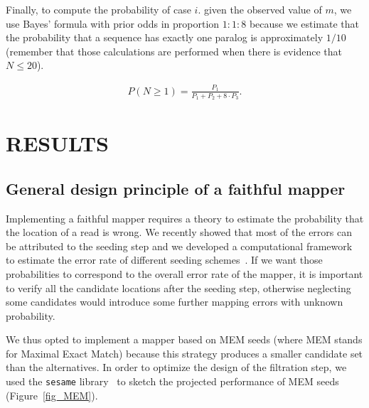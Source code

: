 \documentclass[english]{article}
\begin{document}
Finally, to compute the probability of case $i.$ given the observed value
of $m$, we use Bayes' formula with prior odds in proportion $1:1:8$ because
we estimate that the probability that a sequence has exactly one paralog
is approximately $1/10$ (remember that those calculations are performed
when there is evidence that $N \leq 20$).

\begin{align*}
P(N \geq 1) = \frac{P_1}{P_1 + P_2 + 8\cdot P_3}.
\end{align*}


\section{RESULTS}

\subsection{General design principle of a faithful mapper}

Implementing a faithful mapper requires a theory to estimate the
probability that the location of a read is wrong. We recently showed that
most of the errors can be attributed to the seeding step and we developed
a computational framework to estimate the error rate of different seeding
schemes~\cite{Filion619155}. If we want those probabilities to correspond
to the overall error rate of the mapper, it is important to verify all the
candidate locations after the seeding step, otherwise neglecting some
candidates would introduce some further mapping errors with unknown
probability.

We thus opted to implement a mapper based on MEM seeds (where MEM stands
for Maximal Exact Match) because this strategy produces a smaller
candidate set than the alternatives. In order to optimize the design of
the filtration step, we used the \texttt{sesame}
library~\cite{Filion619155} to sketch the projected performance of MEM
seeds (Figure~\ref{fig_MEM}).
\end{document}
